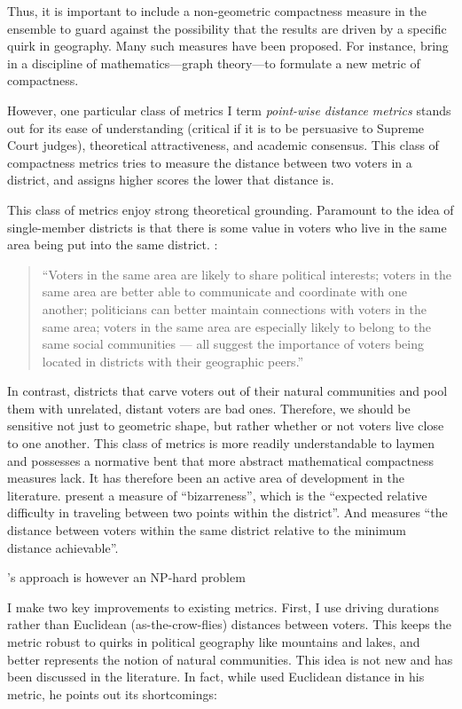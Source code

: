\documentclass[]{article}
\begin{document}
Thus, it is important to include a non-geometric compactness measure in
the ensemble to guard against the possibility that the results are
driven by a specific quirk in geography. Many such measures have been
proposed. For instance, \cite{dc2016} bring in a discipline of
mathematics---graph theory---to formulate a new metric of compactness.

However, one particular class of metrics I term \emph{point-wise
distance metrics} stands out for its ease of understanding (critical if
it is to be persuasive to Supreme Court judges), theoretical
attractiveness, and academic consensus. This class of compactness
metrics tries to measure the distance between two voters in a district,
and assigns higher scores the lower that distance is.

This class of metrics enjoy strong theoretical grounding. Paramount to
the idea of single-member districts is that there is some value in
voters who live in the same area being put into the same district.
\cite{er2019}:

\begin{quote}
``Voters in the same area are likely to share political interests;
voters in the same area are better able to communicate and coordinate
with one another; politicians can better maintain connections with
voters in the same area; voters in the same area are especially likely
to belong to the same social communities --- all suggest the importance
of voters being located in districts with their geographic peers.''
\end{quote}

In contrast, districts that carve voters out of their natural
communities and pool them with unrelated, distant voters are bad ones.
Therefore, we should be sensitive not just to geometric shape, but
rather whether or not voters live close to one another. This class of
metrics is more readily understandable to laymen and possesses a
normative bent that more abstract mathematical compactness measures
lack. It has therefore been an active area of development in the
literature. \cite{cm2010} present a measure of ``bizarreness'', which is
the ``expected relative difficulty in traveling between two points
within the district''. And \cite{fh2011} measures ``the distance between
voters within the same district relative to the minimum distance
achievable''.

\citeauthor{fh2011}'s approach is however an NP-hard problem

I make two key improvements to existing metrics. First, I use driving
durations rather than Euclidean (as-the-crow-flies) distances between
voters. This keeps the metric robust to quirks in political geography
like mountains and lakes, and better represents the notion of natural
communities. This idea is not new and has been discussed in the
literature. In fact, while \cite{fh2011} used Euclidean distance in his
metric, he points out its shortcomings:
\end{document}
